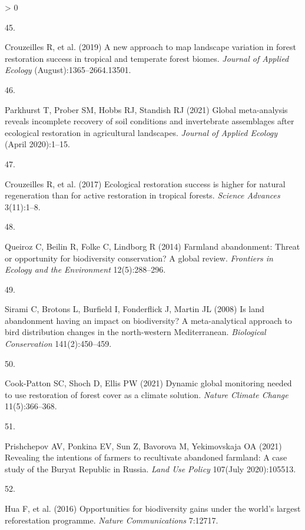 \documentclass[9pt,twocolumn,twoside,lineno]{pnas-new}
\newlength{\csllabelwidth}
\newlength{\cslhangindent}
\newenvironment{CSLReferences}[2] %
 {%
  \setlength{\parindent}{0pt}
  \ifodd #1 \everypar{\setlength{\hangindent}{\cslhangindent}}\ignorespaces\fi
  \ifnum #2 > 0
  \setlength{\parskip}{#2\baselineskip}
  \fi
 }%
 {}
\newcommand{\CSLLeftMargin}[1]{\parbox[t]{\csllabelwidth}{#1}}
\newcommand{\CSLRightInline}[1]{\parbox[t]{\linewidth - \csllabelwidth}{#1}\break}
\begin{document}
\begin{CSLReferences}{0}{0}
\leavevmode\hypertarget{ref-Crouzeilles2019}{}%
\CSLLeftMargin{45. }
\CSLRightInline{Crouzeilles R, et al. (2019) {A new approach to map landscape variation in forest restoration success in tropical and temperate forest biomes}. \emph{Journal of Applied Ecology} (August):1365--2664.13501.}

\leavevmode\hypertarget{ref-Parkhurst2021}{}%
\CSLLeftMargin{46. }
\CSLRightInline{Parkhurst T, Prober SM, Hobbs RJ, Standish RJ (2021) {Global meta-analysis reveals incomplete recovery of soil conditions and invertebrate assemblages after ecological restoration in agricultural landscapes}. \emph{Journal of Applied Ecology} (April 2020):1--15.}

\leavevmode\hypertarget{ref-Crouzeilles2017}{}%
\CSLLeftMargin{47. }
\CSLRightInline{Crouzeilles R, et al. (2017) {Ecological restoration success is higher for natural regeneration than for active restoration in tropical forests}. \emph{Science Advances} 3(11):1--8.}

\leavevmode\hypertarget{ref-Queiroz2014}{}%
\CSLLeftMargin{48. }
\CSLRightInline{Queiroz C, Beilin R, Folke C, Lindborg R (2014) {Farmland abandonment: Threat or opportunity for biodiversity conservation? A global review}. \emph{Frontiers in Ecology and the Environment} 12(5):288--296.}

\leavevmode\hypertarget{ref-Sirami2008}{}%
\CSLLeftMargin{49. }
\CSLRightInline{Sirami C, Brotons L, Burfield I, Fonderflick J, Martin JL (2008) {Is land abandonment having an impact on biodiversity? A meta-analytical approach to bird distribution changes in the north-western Mediterranean}. \emph{Biological Conservation} 141(2):450--459.}

\leavevmode\hypertarget{ref-Cook-Patton2021}{}%
\CSLLeftMargin{50. }
\CSLRightInline{Cook-Patton SC, Shoch D, Ellis PW (2021) {Dynamic global monitoring needed to use restoration of forest cover as a climate solution}. \emph{Nature Climate Change} 11(5):366--368.}

\leavevmode\hypertarget{ref-Prishchepov2021a}{}%
\CSLLeftMargin{51. }
\CSLRightInline{Prishchepov AV, Ponkina EV, Sun Z, Bavorova M, Yekimovskaja OA (2021) {Revealing the intentions of farmers to recultivate abandoned farmland: A case study of the Buryat Republic in Russia}. \emph{Land Use Policy} 107(July 2020):105513.}

\leavevmode\hypertarget{ref-Hua2016}{}%
\CSLLeftMargin{52. }
\CSLRightInline{Hua F, et al. (2016) {Opportunities for biodiversity gains under the world's largest reforestation programme}. \emph{Nature Communications} 7:12717.}


\end{CSLReferences}
\end{document}
